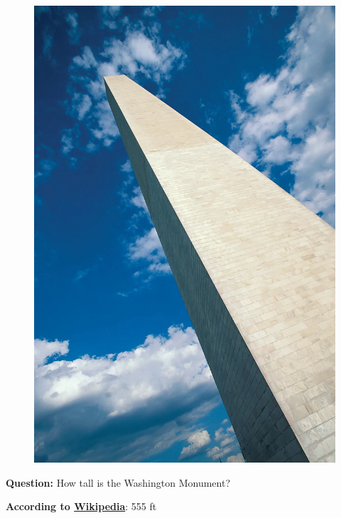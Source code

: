 \documentclass[10pt]{beamer}
\begin{document}
\begin{frame}
\begin{figure}
\includegraphics[width=1\linewidth]{washington-monument.png} 
\end{figure}
{\bf Question:} How tall is the Washington Monument?
\pause

{\bf According to \href{https://en.wikipedia.org/wiki/Washington_Monument}{Wikipedia}}: 555 ft
\pause



\end{frame}
\end{document}
